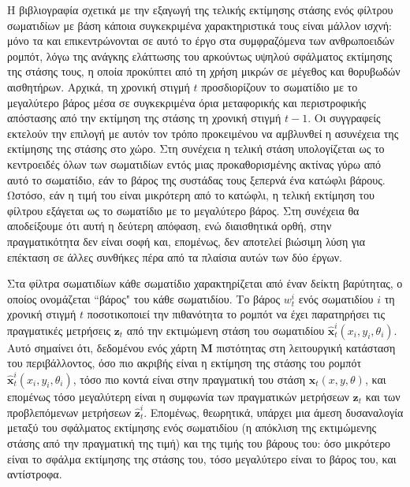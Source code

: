 Η βιβλιογραφία σχετικά με την εξαγωγή της τελικής εκτίμησης στάσης ενός φίλτρου
σωματιδίων με βάση κάποια συγκεκριμένα χαρακτηριστικά τους είναι μάλλον ισχνή:
μόνο τα \cite{Liemhetcharat2010} και \cite{Coltin2013} επικεντρώνονται σε αυτό
το έργο στα συμφραζόμενα των ανθρωποειδών ρομπότ, λόγω της ανάγκης ελάττωσης
του αρκούντως υψηλού σφάλματος εκτίμησης της στάσης τους, η οποία προκύπτει από
τη χρήση μικρών σε μέγεθος και θορυβωδών αισθητήρων.  Αρχικά, τη χρονική στιγμή
$t$ προσδιορίζουν το σωματίδιο με το μεγαλύτερο βάρος μέσα σε συγκεκριμένα όρια
μεταφορικής και περιστροφικής απόστασης από την εκτίμηση της στάσης τη χρονική
στιγμή $t-1$. Οι συγγραφείς εκτελούν την επιλογή με αυτόν τον τρόπο
προκειμένου να αμβλυνθεί η ασυνέχεια της εκτίμησης της στάσης στο χώρο. Στη
συνέχεια η τελική στάση υπολογίζεται ως το κεντροειδές όλων των σωματιδίων
εντός μιας προκαθορισμένης ακτίνας γύρω από αυτό το σωματίδιο, εάν το βάρος της
συστάδας τους ξεπερνά ένα κατώφλι βάρους. Ωστόσο, εάν η τιμή του είναι
μικρότερη από το κατώφλι, η τελική εκτίμηση του φίλτρου εξάγεται ως το
σωματίδιο με το μεγαλύτερο βάρος. Στη συνέχεια θα αποδείξουμε ότι αυτή η
δεύτερη απόφαση, ενώ διαισθητικά ορθή, στην πραγματικότητα δεν είναι σοφή και,
επομένως, δεν αποτελεί βιώσιμη λύση για επέκταση σε άλλες συνθήκες πέρα από τα
πλαίσια αυτών των δύο έργων.

Στα φίλτρα σωματιδίων κάθε σωματίδιο χαρακτηρίζεται από έναν δείκτη
βαρύτητας, ο οποίος ονομάζεται ``βάρος" του κάθε σωματιδίου. Το βάρος $w_t^i$
ενός σωματιδίου $i$ τη χρονική στιγμή $t$ ποσοτικοποιεί την πιθανότητα το
ρομπότ να έχει παρατηρήσει τις πραγματικές μετρήσεις $\bm{z}_t$ από την
εκτιμώμενη στάση του σωματιδίου $\hat{\bm{x}}_t^i(x_i, y_i, \theta_i)$.
Αυτό σημαίνει ότι, δεδομένου ενός χάρτη $\bm{M}$ πιστότητας στη λειτουργική
κατάσταση του περιβάλλοντος, όσο πιο ακριβής είναι η εκτίμηση της στάσης του
ρομπότ $\hat{\bm{x}}_t^i(x_i, y_i, \theta_i)$, τόσο πιο κοντά είναι στην
πραγματική του στάση $\bm{x}_t(x,y,\theta)$, και επομένως τόσο
μεγαλύτερη είναι η συμφωνία των πραγματικών μετρήσεων $\bm{z}_t$ και των
προβλεπόμενων μετρήσεων $\hat{\bm{z}}_t^i$. Επομένως, θεωρητικά, υπάρχει μια
άμεση δυσαναλογία μεταξύ του σφάλματος εκτίμησης ενός σωματιδίου (η απόκλιση
της εκτιμώμενης στάσης από την πραγματική της τιμή) και της τιμής του βάρους
του: όσο μικρότερο είναι το σφάλμα εκτίμησης της στάσης του, τόσο μεγαλύτερο
είναι το βάρος του, και αντίστροφα.

